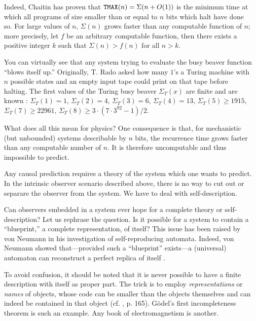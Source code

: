Indeed, Chaitin has proven
 \cite{rado,chaitin-ACM,chaitin-bb,dewdney,brady} that
 ${\tt TMAX}(n)=\Sigma (n+O(1))$ is the minimum time at which all
programs of
size smaller than or equal to $n$ bits which halt have done so.
 For large values of $n$, $\Sigma
(n)$  grows faster than any computable function
 of $n$; more precisely, let $f$
 be an arbitrary computable function, then there exists a positive
integer
$k$
 such that
$\Sigma (n)>f(n)$ for all $n>k$.

You can virtually see that any system trying to evaluate the busy beaver
function ``blows itself up.''
 Originally, T. Rado \cite{rado}
 asked how
 many $1$'s a Turing machine with $n$ possible states and an empty
 input tape
 could print on that tape before halting.
 The first values of the Turing busy beaver $\Sigma _T(x)$
 are finite and are known \cite{dewdney,brady}:
  $\Sigma _T(1)=1$,
 $\Sigma _T(2)= 4$,
  $\Sigma _T(3)=6$,
 $\Sigma _T(4)= 13$,
 $\Sigma _T(5) \ge 1915$,
 $\Sigma_T(7)\ge 22961$,
 $\Sigma_T(8)\ge 3\cdot (7\cdot 3^{92}-1)/2$.

What does all this mean for physics?
One consequence is that, for mechanistic (but unbounded) systems
describable by $n$ bits,
the recurrence time grows faster than any computable number
of $n$. It is therefore uncomputable and thus impossible to predict.



Any causal prediction requires a theory
 of the system which one wants to predict.
In the intrinsic observer scenario described above, there is no way to
cut out or separare the observer from the system. We have to deal with
self-description.

Can observers embedded in a system ever hope for a
complete theory or self-description?
Let us rephrase the question.
Is it possible for a system to contain a ``blueprint,'' a complete
representation, of itself?
This issue has been raised by von Neumann
in his investigation of self-reproducing automata. Indeed, von Neumann
showed that---provided  such a
``blueprint'' exists---a (universal) automaton can
reconstruct a perfect replica of itself \cite{burks,rogers1,odi:89}.

To avoid confusion, it should be noted that it is never possible to have
a finite description with itself as proper part.
The trick is to employ {\em representations} or {\em names} of objects,
whose code
can be smaller than the objects themselves and can indeed be contained
in that object (cf. \cite{odi:89}, p. 165).
G\"odel's first incompleteness theorem
is such an example. Any book of electromagnetism is another.

